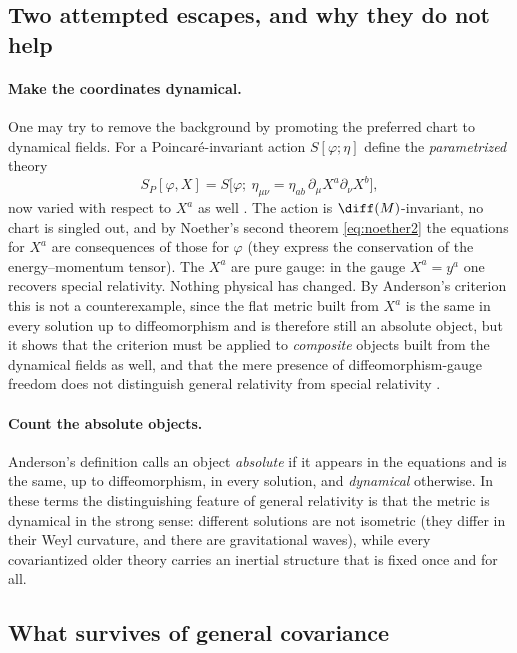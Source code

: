 \subsection{Two attempted escapes, and why they do not help}

\paragraph{Make the coordinates dynamical.}
One may try to remove the background by promoting the preferred chart to
dynamical fields. For a Poincar\'e-invariant action $S[\varphi;\eta]$ define the
\emph{parametrized} theory
\begin{equation}
  S_P[\varphi,X]=S\big[\varphi;\ \eta_{\mu\nu}=\eta_{ab}\,\partial_\mu X^a\partial_\nu X^b\big],
\end{equation}
now varied with respect to $X^a$ as well \cite{kuchar}. The action is
$\diff(M)$-invariant, no chart is singled out, and by Noether's second theorem
\eqref{eq:noether2} the equations for $X^a$ are consequences of those for
$\varphi$ (they express the conservation of the energy--momentum tensor). The
$X^a$ are pure gauge: in the gauge $X^a=y^a$ one recovers special relativity.
Nothing physical has changed. By Anderson's criterion this is not a
counterexample, since the flat metric built from $X^a$ is the same in every
solution up to diffeomorphism and is therefore still an absolute object, but
it shows that the criterion must be applied to \emph{composite} objects built
from the dynamical fields as well, and that the mere presence of
diffeomorphism-gauge freedom does not distinguish general relativity from
special relativity \cite{giulini}.

\paragraph{Count the absolute objects.}
Anderson's definition calls an object \emph{absolute} if it appears in the
equations and is the same, up to diffeomorphism, in every solution, and
\emph{dynamical} otherwise. In these terms the distinguishing feature of general
relativity is that the metric is dynamical in the strong sense: different
solutions are not isometric (they differ in their Weyl curvature, and there
are gravitational waves), while every covariantized older theory carries an
inertial structure that is fixed once and for all.

\subsection{What survives of general covariance}

